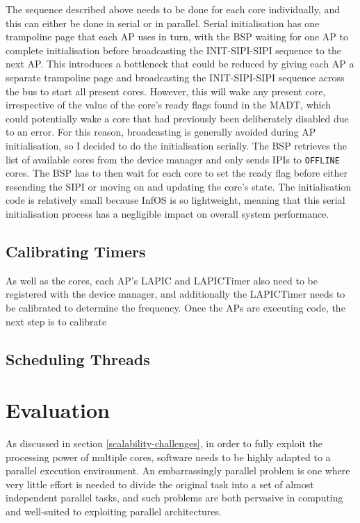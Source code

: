 \documentclass[bsc,frontabs,twoside,singlespacing,parskip,deptreport]{infthesis}     %
\begin{document}
The sequence described above needs to be done for each core individually, and this can either be done in serial or in parallel. Serial initialisation has one trampoline page that each AP uses in turn, with the BSP waiting for one AP to complete initialisation before broadcasting the INIT-SIPI-SIPI sequence to the next AP. This introduces a bottleneck that could be reduced by giving each AP a separate trampoline page and broadcasting the INIT-SIPI-SIPI sequence across the bus to start all present cores. However, this will wake any present core, irrespective of the value of the core's ready flags found in the MADT, which could potentially wake a core that had previously been deliberately disabled due to an error. For this reason, broadcasting is generally avoided during AP initialisation, so I decided to do the initialisation serially. The BSP retrieves the list of available cores from the device manager and only sends IPIs to \verb|OFFLINE| cores. The BSP has to then wait for each core to set the ready flag before either resending the SIPI or moving on and updating the core's state. The initialisation code is relatively small because InfOS is so lightweight, meaning that this serial initialisation process has a negligible impact on overall system performance.

\section{Calibrating Timers} \label{calibrating-timers}
As well as the cores, each AP's LAPIC and LAPICTimer also need to be registered with the device manager, and additionally the LAPICTimer needs to be calibrated to determine the frequency.
Once the APs are executing code, the next step is to calibrate 

\section{Scheduling Threads} \label{scheduling-threads}


\chapter{Evaluation}

As discussed in section \ref{scalability-challenges}, in order to fully exploit the processing power of multiple cores, software needs to be highly adapted to a parallel execution environment. An embarrassingly parallel problem is one where very little effort is needed to divide the original task into a set of almost independent parallel tasks, and such problems are both pervasive in computing and well-suited to exploiting parallel architectures. 
\end{document}
